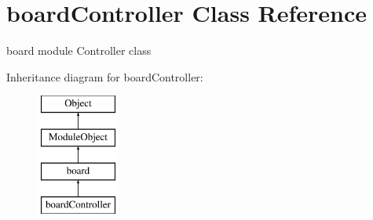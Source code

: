 \hypertarget{classboardController}{\section{board\-Controller Class Reference}
\label{classboardController}
}


board module Controller class  


Inheritance diagram for board\-Controller\-:\begin{figure}[H]
\begin{center}
\leavevmode
\includegraphics[height=4.000000cm]{classboardController}
\end{center}
\end{figure}
